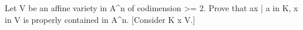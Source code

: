 Let V be an affine variety in A^n of codimension >= 2. Prove that {ax | a in K, x in V} is properly contained in A^n. [Consider K x V.]
